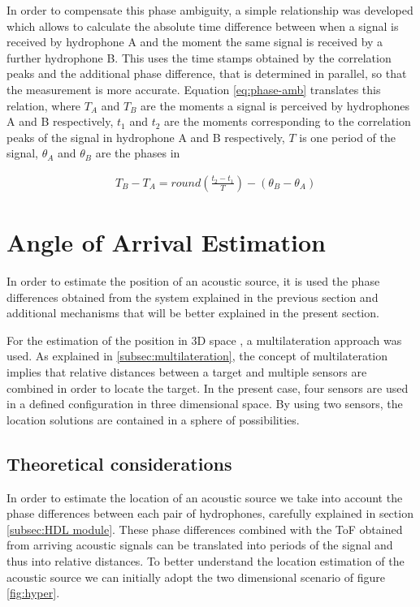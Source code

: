 In order to compensate this phase ambiguity, a simple relationship was developed which allows to calculate the absolute time difference between when a signal is received by hydrophone A and the moment the same signal is received by a further hydrophone B. This uses the time stamps obtained by the correlation peaks and the additional phase difference, that is determined in parallel, so that the measurement is more accurate. Equation \ref{eq:phase-amb} translates this relation, where $T_A$ and $T_B$ are the moments a signal is perceived by hydrophones A and B respectively, $t_1$ and $t_2$ are the moments corresponding to the correlation peaks of the signal in hydrophone A and B respectively, $T$ is one period of the signal, $\theta_A$ and $\theta_B$ are the phases in 

\begin{eqnarray}
& T_B - T_A = round(\frac{t_2-t_1}{T}) - (\theta_B - \theta_A)
\label{eq:phase-amb}
\end{eqnarray}


\section{Angle of Arrival Estimation} \label{subsec:AoA}

In order to estimate the position of an acoustic source, it is used the phase differences obtained from the system explained in the previous section and additional mechanisms that will be better explained in the present section.

For the estimation of the position in 3D space , a multilateration approach was used. As explained in \ref{subsec:multilateration}, the concept of multilateration implies that relative distances between a target and multiple sensors are combined in order to locate the target. In the present case, four sensors are used in a defined configuration in three dimensional space. By using two sensors, the location solutions are contained in a sphere of possibilities. 

\subsection{Theoretical considerations}
In order to estimate the location of an acoustic source we take into account the phase differences between each pair of hydrophones, carefully explained in  section \ref{subsec:HDL module}. These phase differences combined with the ToF obtained from arriving acoustic signals can be translated into periods of the signal and thus into relative distances. To better understand the location estimation of the acoustic source we can initially adopt the two dimensional scenario of figure \ref{fig:hyper}. 

